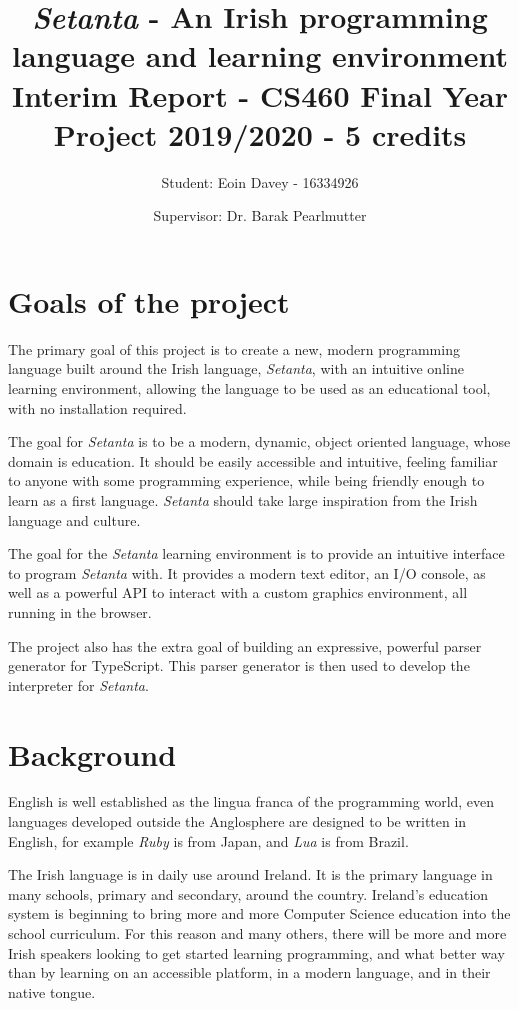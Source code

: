 \documentclass[11pt]{extarticle}
\newcommand{\Setanta}{\emph{Setanta}}
\begin{document}
    \title{
    \LARGE \textbf{\Setanta{} - An Irish programming language and learning environment}\\
    \Large Interim Report - CS460 Final Year Project 2019/2020 - 5 credits}
    \author{\Large Student: Eoin Davey - 16334926 \and \Large Supervisor: Dr. Barak Pearlmutter}
    \maketitle
    \section{Goals of the project}

        The primary goal of this project is to create a new, modern programming language built around the Irish language, \Setanta{}, with an intuitive online learning environment, allowing the language to be used as an educational tool, with no installation required.

        The goal for \Setanta{} is to be a modern, dynamic, object oriented language, whose domain is education. It should be easily accessible and intuitive, feeling familiar to anyone with some programming experience, while being friendly enough to learn as a first language. \Setanta{} should take large inspiration from the Irish language and culture.

        The goal for the \Setanta{} learning environment is to provide an intuitive interface to program \Setanta{} with. It provides a modern text editor, an I/O console, as well as a powerful API to interact with a custom graphics environment, all running in the browser.

        The project also has the extra goal of building an expressive, powerful parser generator for TypeScript. This parser generator is then used to develop the interpreter for \Setanta{}.

    \section{Background}

        English is well established as the lingua franca of the programming world, even languages developed outside the Anglosphere are designed to be written in English, for example \emph{Ruby} is from Japan, and \emph{Lua} is from Brazil.
        
        The Irish language is in daily use around Ireland. It is the primary language in many schools, primary and secondary, around the country. Ireland's education system is beginning to bring more and more Computer Science education into the school curriculum. For this reason and many others, there will be more and more Irish speakers looking to get started learning programming, and what better way than by learning on an accessible platform, in a modern language, and in their native tongue.
\end{document}
